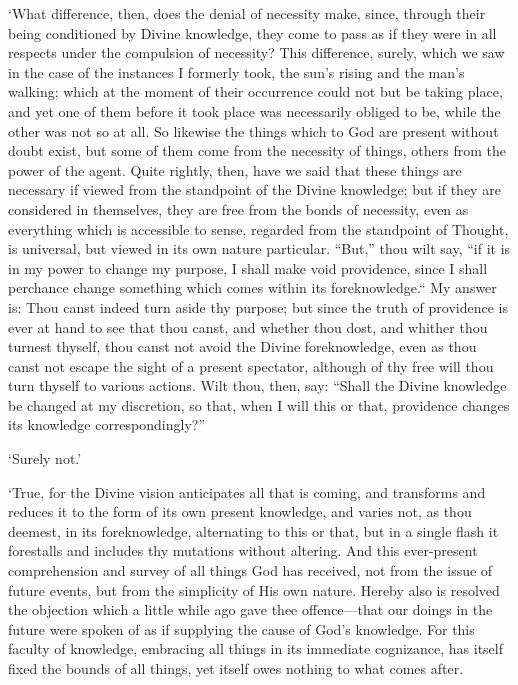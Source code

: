 \documentclass[12pt]{book}
\begin{document}
`What difference, then, does the denial of necessity make, since,
through their being conditioned by Divine knowledge, they come to pass
as if they were in all respects under the compulsion of necessity? This
difference, surely, which we saw in the case of the instances I formerly
took, the sun's rising and the man's walking; which at the moment of
their occurrence could not but be taking place, and yet one of them
before it took place was necessarily obliged to be, while the other was
not so at all. So likewise the things which to God are present without
doubt exist, but some of them come from the necessity of things, others
from the power of the agent. Quite rightly, then, have we said that
these things are necessary if viewed from the standpoint of the Divine
knowledge; but if they are considered in themselves, they are free from
the bonds of necessity, even as everything which is accessible to sense,
regarded from the standpoint of Thought, is universal, but viewed in its
own nature particular. ``But,'' thou wilt say, ``if it is in my power to
change my purpose, I shall make void providence, since I shall perchance
change something which comes within its foreknowledge.`` My answer is:
Thou canst indeed turn aside thy purpose; but since the truth of
providence is ever at hand to see that thou canst, and whether thou
dost, and whither thou turnest thyself, thou canst not avoid the Divine
foreknowledge, even as thou canst not escape the sight of a present
spectator, although of thy free will thou turn thyself to various
actions. Wilt thou, then, say: ``Shall the Divine knowledge be changed at
my discretion, so that, when I will this or that, providence changes its
knowledge correspondingly?''

`Surely not.'

`True, for the Divine vision anticipates all that is coming, and
transforms and reduces it to the form of its own present knowledge, and
varies not, as thou deemest, in its foreknowledge, alternating to this
or that, but in a single flash it forestalls and includes thy mutations
without altering. And this ever-present comprehension and survey of all
things God has received, not from the issue of future events, but from
the simplicity of His own nature. Hereby also is resolved the objection
which a little while ago gave thee offence---that our doings in the
future were spoken of as if supplying the cause of God's knowledge. For
this faculty of knowledge, embracing all things in its immediate
cognizance, has itself fixed the bounds of all things, yet itself owes
nothing to what comes after.
\end{document}
